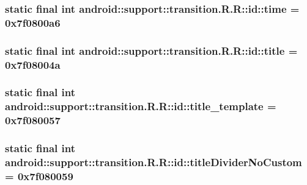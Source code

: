 \hypertarget{classandroid_1_1support_1_1transition_1_1_r_1_1id_5e837c55341912ac6da5ed81b1fa382b}{
\subsubsection[{time}]{\setlength{\rightskip}{0pt plus 5cm}static final int android::support::transition.R.R::id::time = 0x7f0800a6}}
\label{classandroid_1_1support_1_1transition_1_1_r_1_1id_5e837c55341912ac6da5ed81b1fa382b}


\hypertarget{classandroid_1_1support_1_1transition_1_1_r_1_1id_c039495ac9e061da1cede35c2758f125}{
\subsubsection[{title}]{\setlength{\rightskip}{0pt plus 5cm}static final int android::support::transition.R.R::id::title = 0x7f08004a}}
\label{classandroid_1_1support_1_1transition_1_1_r_1_1id_c039495ac9e061da1cede35c2758f125}


\hypertarget{classandroid_1_1support_1_1transition_1_1_r_1_1id_5e2063f3f797f643a359bddfb2c53be8}{
\subsubsection[{title\_\-template}]{\setlength{\rightskip}{0pt plus 5cm}static final int android::support::transition.R.R::id::title\_\-template = 0x7f080057}}
\label{classandroid_1_1support_1_1transition_1_1_r_1_1id_5e2063f3f797f643a359bddfb2c53be8}


\hypertarget{classandroid_1_1support_1_1transition_1_1_r_1_1id_64efe6c129ea0f16fe41e153508ef84d}{
\subsubsection[{titleDividerNoCustom}]{\setlength{\rightskip}{0pt plus 5cm}static final int android::support::transition.R.R::id::titleDividerNoCustom = 0x7f080059}}
\label{classandroid_1_1support_1_1transition_1_1_r_1_1id_64efe6c129ea0f16fe41e153508ef84d}


